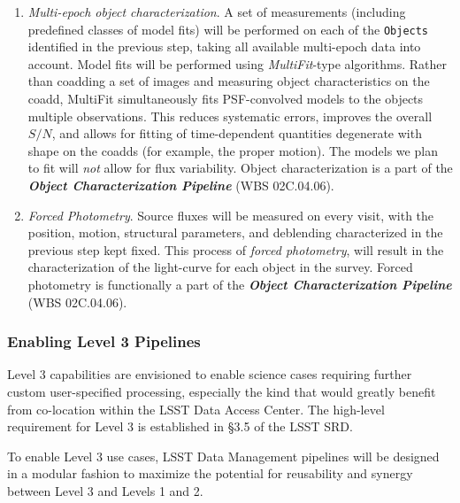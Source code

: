 \documentclass[12pt]{article}
\newcommand{\code}[1]{\texttt{#1}}
\newcommand{\Objects}{\code{Objects}\xspace}
\newcommand{\wbsObjChar}{WBS 02C.04.06}
\begin{document}
\begin{enumerate}
    \item \emph{Multi-epoch object characterization}. A set of measurements (including predefined classes of model fits) will be performed on each of the \Objects identified in the previous step, taking all available multi-epoch data into account. Model fits will be performed using \emph{MultiFit}-type algorithms. Rather than coadding a set of images and measuring object characteristics on the coadd, MultiFit simultaneously fits PSF-convolved models to the objects multiple observations. This reduces systematic errors, improves the overall $S/N$, and allows for fitting of time-dependent quantities degenerate with shape on the coadds (for example, the proper motion). The models we plan to fit will \emph{not} allow for flux variability. Object characterization is a part of the {\bf \emph{Object Characterization Pipeline}} (\wbsObjChar).
    \item \emph{Forced Photometry}. Source fluxes will be measured on every visit, with the position, motion, structural parameters, and deblending characterized in the previous step kept fixed.
      This process of \emph{forced photometry}, will result in the characterization of the light-curve for each object in the survey. Forced photometry is functionally a part of the {\bf \emph{Object Characterization Pipeline}} (\wbsObjChar).
\end{enumerate}



\subsubsection{Enabling Level 3 Pipelines}

Level 3 capabilities are envisioned to enable science cases requiring further custom user-specified processing, especially the kind that would greatly benefit from co-location within the LSST Data Access Center. The high-level requirement for Level 3 is established in \S 3.5 of the LSST SRD.

To enable Level 3 use cases, LSST Data Management pipelines will be designed in a modular fashion to maximize the potential for reusability and synergy between Level 3 and Levels 1 and 2.
\end{document}
